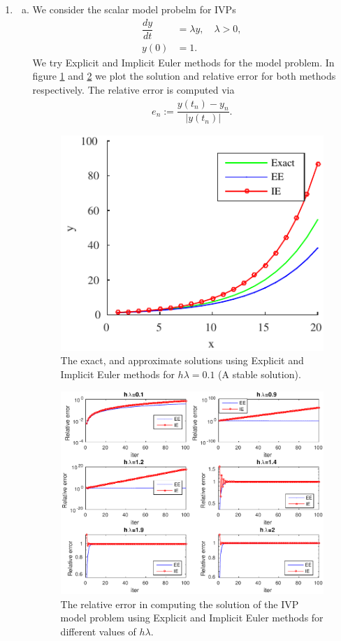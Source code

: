 \documentclass[10pt,a4paper,twoside, french]{article}
\numberwithin{equation}{section}
\numberwithin{figure}{section}
\numberwithin{table}{section}
\begin{document}
\begin{enumerate}
\setcounter{section}{3}
\item  \begin{enumerate}[a.]
\item We consider the scalar model probelm for IVPs
\begin{align*}
\dfrac{dy}{dt} &= \lambda y,\quad \lambda>0,\\
y(0) &= 1.
\end{align*}
We try Explicit and Implicit Euler methods for the model problem. In figure \ref{fig:eeie_sol} and \ref{fig:eeie_err} we plot the solution and relative error for both methods respectively. The relative error is computed via 
\begin{align*}
e_n := \dfrac{y(t_n)-y_n}{|y(t_n)|}.
\end{align*}
\begin{figure}[h]
\centering
\includegraphics[scale=1]{fig/eeie_sol}
\caption{The exact, and approximate solutions using Explicit and Implicit Euler methods for $h\lambda=0.1$ (A stable solution).}
\label{fig:eeie_sol}
\end{figure}
\begin{figure}[h]
\centering
\includegraphics[scale=.9]{fig/eeie_errors}
\caption{The relative error in computing the solution of the IVP model problem using Explicit and Implicit Euler methods for different values of $h\lambda$.}
\label{fig:eeie_err}
\end{figure}


\end{enumerate}
\end{enumerate}
\end{document}
